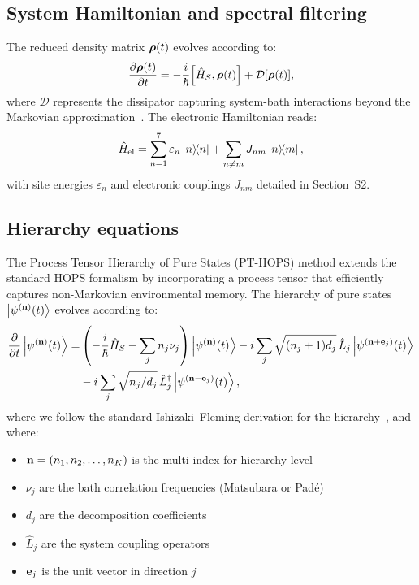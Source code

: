 \documentclass[11pt,a4paper]{article}
\begin{document}
\subsection{System Hamiltonian and spectral filtering}
\label{sec:pulse}

The reduced density matrix $\vb*{\rho}(t)$ evolves according to:
\begin{equation}
\pdv{\vb*{\rho}(t)}{t} = -\frac{i}{\hbar}\comm{\hat{H}_S}{\vb*{\rho}(t)} + \mathcal{D}[\vb*{\rho}(t)],
\label{eq:SI_master_eq}
\end{equation}
where $\mathcal{D}$ represents the dissipator capturing system-bath interactions beyond the Markovian approximation~\cite{Tanimura1989}. The electronic Hamiltonian reads:
\begin{equation}
\hat{H}_{\mathrm{el}} = \sum_{n=1}^{7} \varepsilon_n \dyad{n} + \sum_{n \neq m} J_{nm} \dyad{n}{m},
\label{eq:SI_excitonic_hamiltonian}
\end{equation}
with site energies $\varepsilon_n$ and electronic couplings $J_{nm}$ detailed in Section~S2.

\subsection{Hierarchy equations}

The Process Tensor Hierarchy of Pure States (PT-HOPS) method extends the standard HOPS formalism by incorporating a process tensor that efficiently captures non-Markovian environmental memory. The hierarchy of pure states $\ket{\psi^{(\vb{n})}(t)}$ evolves according to:
\begin{equation}
\begin{split}
\pdv{t}\ket{\psi^{(\vb{n})}(t)} = &\left(-\frac{i}{\hbar}\hat{H}_S - \sum_{j} n_j \nu_j\right)\ket{\psi^{(\vb{n})}(t)} 
- i\sum_{j} \sqrt{(n_j+1)d_j} \, \hat{L}_j \ket{\psi^{(\vb{n}+\vb{e}_j)}(t)} \\
&- i\sum_{j} \sqrt{n_j/d_j} \, \hat{L}_j^\dagger \ket{\psi^{(\vb{n}-\vb{e}_j)}(t)},   
\end{split}
\label{eq:SI_hops}
\end{equation}
where we follow the standard Ishizaki--Fleming derivation for the hierarchy~\cite{Ishizaki2009a,Strathearn2018}, and where:
\begin{itemize}
\item $\vb{n} = (n_1, n_2, \ldots, n_K)$ is the multi-index for hierarchy level
\item $\nu_j$ are the bath correlation frequencies (Matsubara or Padé)
\item $d_j$ are the decomposition coefficients
\item $\hat{L}_j$ are the system coupling operators
\item $\vb{e}_j$ is the unit vector in direction $j$
\end{itemize}
\end{document}
